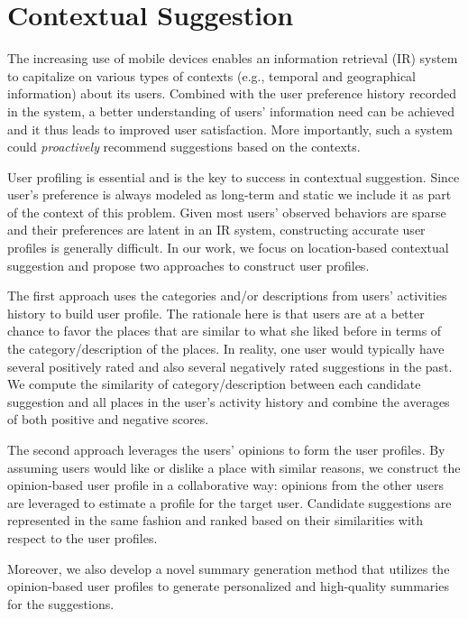 %
%
\chapter{Contextual Suggestion}
The increasing use of mobile devices enables an information retrieval (IR) 
system to capitalize on various types of contexts 
(e.g., temporal and geographical information) about its users. 
Combined with the user preference history recorded in the system, 
a better understanding of users' information need can be achieved and 
it thus leads to improved user satisfaction. More importantly, such a 
system could {\em proactively} recommend suggestions based on the contexts.

User profiling is essential and is the key to success in contextual suggestion. 
Since user's preference is always modeled as long-term and static we include 
it as part of the context of this problem.
Given most users' observed behaviors are sparse and their preferences are 
latent in an IR system, constructing accurate user profiles is generally 
difficult. In our work, we focus on location-based contextual suggestion 
and propose two approaches to construct user profiles. 

The first approach uses the categories and/or descriptions from 
users' activities history to build user profile. The rationale here is 
that users are at a better chance to favor the places that are similar 
to what she liked before in terms of the category/description of the places. 
In reality, one user would typically have several positively rated and also 
several negatively rated suggestions in the past. We compute the similarity 
of category/description between each candidate suggestion and all 
places in the user's activity history and combine the averages of 
both positive and negative scores. 

The second approach leverages the users' opinions to form the user profiles. 
By assuming users would like or dislike a place with similar reasons, 
we construct the opinion-based user profile in a collaborative way: 
opinions from the other users are leveraged to estimate a profile for 
the target user. Candidate suggestions are represented in the same fashion 
and ranked based on their similarities with respect to the user profiles.

Moreover, we also develop a novel summary generation method that utilizes 
the opinion-based user profiles to generate personalized and high-quality 
summaries for the suggestions. 

